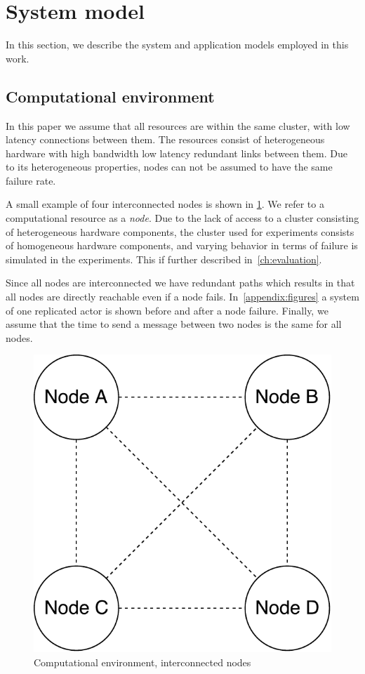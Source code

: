 \documentclass{cslthse-msc}
\begin{document}
\section{System model} \label{sec:design_system_model}
In this section, we describe the system and application models employed in this work.

\subsection{Computational environment} \label{subsec:design_comp_env}
In this paper we assume that all resources are within the same cluster, with low latency connections between them. The resources consist of heterogeneous hardware with high bandwidth low latency redundant links between them. Due to its heterogeneous properties, nodes can not be assumed to have the same failure rate.

A small example of four interconnected nodes  is shown in \cref{fig:computational_environment}. We refer to a computational resource as a \emph{node}. Due to the lack of access to a cluster consisting of heterogeneous hardware components, the cluster used for experiments consists of homogeneous hardware components, and varying behavior in terms of failure is simulated in the experiments. This if further described in~\cref{ch:evaluation}.

Since all nodes are interconnected we have redundant paths which results in that all nodes are directly reachable even if a node fails. In~\cref{appendix:figures} a system of one replicated actor is shown before and after a node failure. Finally, we assume that the time to send a message between two nodes is the same for all nodes.

\begin{figure}[!hbt]
\centering
\includegraphics[scale=0.5]{images/computational_environment.pdf}
\caption{Computational environment, interconnected nodes} \label{fig:computational_environment}
\end{figure}
\end{document}
